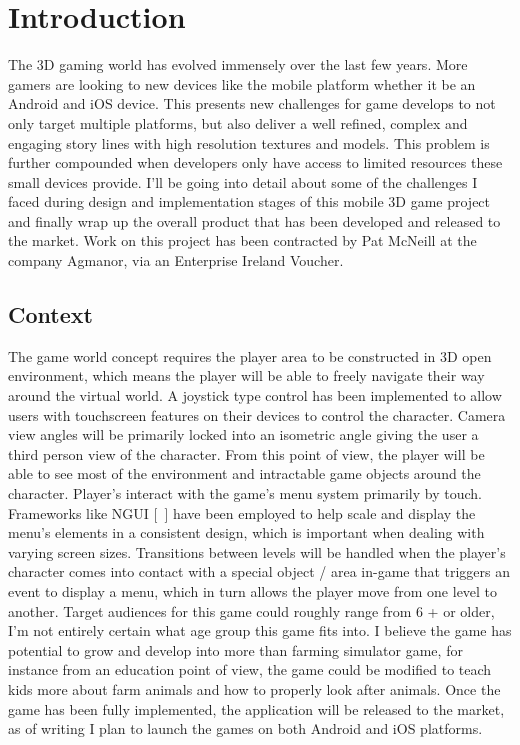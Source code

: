 \chapter{Introduction}
The 3D gaming world has evolved immensely over the last few years. More gamers are looking to new devices like the mobile platform whether it be an Android and iOS device. This presents new challenges for game develops to not only target multiple platforms, but also deliver a well refined, complex and engaging story lines with high resolution textures and models. This problem is further compounded when developers only have access to limited resources these small devices provide. I'll be going into detail about some of the challenges I faced during design and implementation stages of this mobile 3D game project and finally wrap up the overall product that has been developed and released to the market. Work on this project has been contracted by Pat McNeill at the company Agmanor, via an Enterprise Ireland Voucher.
   
\section{Context}
The game world concept requires the player area to be constructed in 3D open environment, which means the player will be able to freely navigate their way around the virtual world. A joystick type control has been implemented to allow users with touchscreen features on their devices to control the character. Camera view angles will be primarily locked into an isometric angle giving the user a third person view of the character. From this point of view, the player will be able to see most of the environment and intractable game objects around the character. Player's interact with the game's menu system primarily by touch. Frameworks like NGUI [~\cite{NGUI}] have been employed to help scale and display the menu's elements in a consistent design, which is important when dealing with varying screen sizes. Transitions between levels will be handled when the player’s character comes into contact with a special object / area in-game that triggers an event to display a menu, which in turn allows the player move from one level to another. 
Target audiences for this game could roughly range from 6 + or older, I'm not entirely certain what age group this game fits into. I believe the game has potential to grow and develop into more than farming simulator game, for instance from an education point of view, the game could be modified to teach kids more about farm animals and how to properly look after animals.
Once the game has been fully implemented, the application will be released to the market, as of writing I plan to launch the games on both Android and iOS platforms.  


